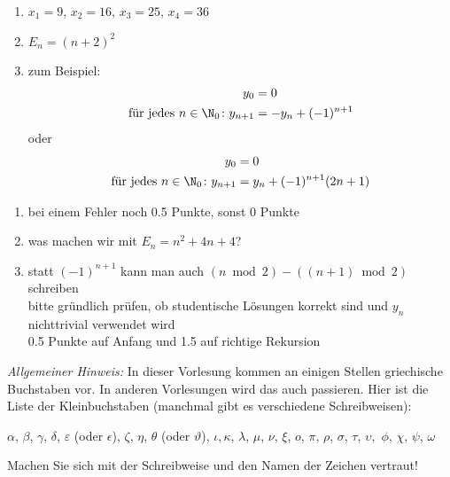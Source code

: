 \documentclass[12pt]{article}
\begin{document}
\begin{loesung}
  \begin{enumerate}
  \item $x_1=9$, $x_2=16$, $x_3=25$, $x_4=36$
  \item $E_n=(n+2)^2$
  \item zum Beispiel:
    \begin{align*}
      y_0 &= 0\\
      \text{für jedes } n\in\N_0\colon y_{n+1} &= -y_n + (-1)^{n+1}
    \end{align*}
    oder
    \begin{align*}
      y_0 &= 0\\
      \text{für jedes } n\in\N_0\colon y_{n+1} &= y_n + (-1)^{n+1}(2n+1)
    \end{align*}
  \end{enumerate}

  \begin{korrektur}
    \begin{enumerate}
    \item bei einem Fehler noch 0.5 Punkte, sonst 0 Punkte
    \item was machen wir mit $E_n=n^2+4n+4$?
    \item statt $(-1)^{n+1}$
      kann man \zB auch $(n\bmod 2) - ((n+1) \bmod 2)$
      schreiben\\
      bitte gründlich prüfen, ob studentische Lösungen
      korrekt sind
      und $y_n$ nichttrivial verwendet wird \\
      0.5 Punkte auf Anfang und 1.5 auf richtige Rekursion
    \end{enumerate}
  \end{korrektur}
\end{loesung}

\noindent
\emph{Allgemeiner Hinweis:} In dieser Vorlesung kommen an einigen
Stellen griechische Buchstaben vor. In anderen Vorlesungen wird das
auch passieren. Hier ist die Liste der Kleinbuchstaben (manchmal gibt
es verschiedene Schreibweisen):

$\alpha$,
$\beta$,
$\gamma$,
$\delta$,
$\varepsilon$
(oder $\epsilon$),
$\zeta$,
$\eta$,
$\theta$
(oder $\vartheta$),
$\iota, \kappa$,
$\lambda$,
$\mu$,
$\nu$,
$\xi$,
$o$,
$\pi$,
$\rho$,
$\sigma$,
$\tau$, $\upsilon,$ $\phi$, $\chi$, $\psi$, $\omega$

\noindent
Machen Sie sich mit der Schreibweise und den Namen der Zeichen vertraut!
\end{document}
